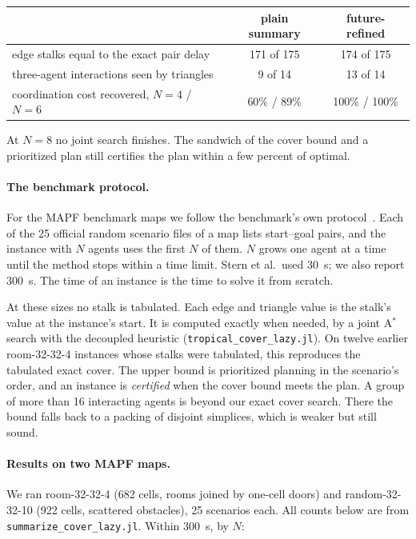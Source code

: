\documentclass[11pt]{article}
\theoremstyle{definition}
\theoremstyle{remark}
\begin{document}
\begin{center}
\begin{tabular}{lcc}
\toprule
& plain summary & future-refined \\
\midrule
edge stalks equal to the exact pair delay & 171 of 175 & 174 of 175 \\
three-agent interactions seen by triangles & 9 of 14 & 13 of 14 \\
coordination cost recovered, $N = 4$ / $N = 6$ & 60\% / 89\% & 100\% / 100\% \\
\bottomrule
\end{tabular}
\end{center}

At $N = 8$ no joint search finishes. The sandwich of the cover bound and a
prioritized plan still certifies the plan within a few percent of optimal.

\paragraph{The benchmark protocol.}\label{sec:mapf-protocol}
For the MAPF benchmark maps we follow the benchmark's own protocol~\cite{stern2019}.
Each of the 25 official random scenario files of a map lists start--goal pairs, and
the instance with $N$ agents uses the first $N$ of them. $N$ grows one agent at a
time until the method stops within a time limit. Stern et al.\ used 30~s; we also
report 300~s. The time of an instance is the time to solve it from scratch.

At these sizes no stalk is tabulated. Each edge and triangle value is the stalk's
value at the instance's start. It is computed exactly when needed, by a joint A$^*$
search with the decoupled heuristic (\texttt{tropical\_cover\_lazy.jl}). On twelve
earlier room-32-32-4 instances whose stalks were tabulated, this reproduces the
tabulated exact cover. The upper bound is prioritized planning in the scenario's
order, and an instance is \emph{certified} when the cover bound meets the plan. A
group of more than 16 interacting agents is beyond our exact cover search. There
the bound falls back to a packing of disjoint simplices, which is weaker but still
sound.

\paragraph{Results on two MAPF maps.}
We ran room-32-32-4 (682 cells, rooms joined by one-cell doors) and
random-32-32-10 (922 cells, scattered obstacles), 25 scenarios each. All counts
below are from \texttt{summarize\_cover\_lazy.jl}. Within 300~s, by $N$:
\end{document}
